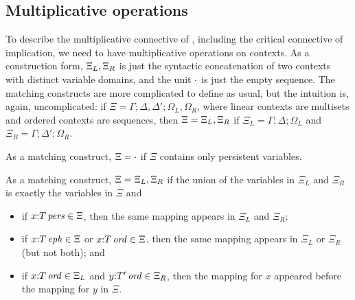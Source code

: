 \subsection{Multiplicative operations}

To describe the multiplicative connective of \ollll, including the critical
connective of implication, we need to have multiplicative operations on 
contexts. As a construction form, ${\Xi_L},{\Xi_R}$ is just the
syntactic concatenation of two contexts with distinct variable domains, and
the unit $\cdot$ is just the empty sequence. The matching constructs
are more complicated to define as usual, but the intuition is, again, 
uncomplicated: if 
$\Xi = \Gamma; \Delta, \Delta'; \Omega_L, \Omega_R$, where linear contexts
are multisets and ordered contexts are sequences, then 
$\Xi = {\Xi_L},{\Xi_R}$ if $\Xi_L = \Gamma; \Delta; \Omega_L$ and
$\Xi_R = \Gamma; \Delta'; \Omega_R$.

\bigskip
\begin{definition}[Conjunction]
As a matching construct, $\Xi = \cdot$ if $\Xi$ contains only
persistent variables.

As a matching construct, $\Xi = {\Xi_L},{\Xi_R}$ if the union 
of the variables in $\Xi_L$ and $\Xi_R$ is exactly the variables in $\Xi$
and 
\begin{itemize}
\item if $x{:}{T}\,{{\it pers}} \in \Xi$, then the same mapping appears in $\Xi_L$
  and $\Xi_R$;
\item if $x{:}{T}\,{{\it eph}} \in \Xi$ or $x{:}{T}\,{{\it ord}} \in \Xi$, then the
  same mapping appears in $\Xi_L$ or $\Xi_R$ (but not both); and
\item if $x{:}{T}\,{{\it ord}} \in \Xi_L$ and $y{:}{T'}\,{{\it ord}} \in \Xi_R$, then
  the mapping for $x$ appeared before the mapping for $y$ in $\Xi$. 
\end{itemize}
\end{definition}
\bigskip

